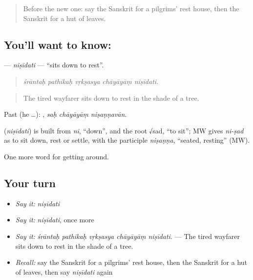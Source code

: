 \label{lesson:SA-C402-nisidati}



\begin{quote}
Before the new one: say the Sanskrit for a pilgrims' rest house, then the Sanskrit for a hut of leaves.
\end{quote}

\subsection*{You'll want to know: }
\textbf{} — \emph{niṣīdati} — \textquotedblleft{}sits down to rest\textquotedblright{}.

\begin{quote}
    
\end{quote}

\begin{quote}
\emph{śrāntaḥ pathikaḥ vṛkṣasya chāyāyāṃ niṣīdati.}
\end{quote}

\begin{quote}
The tired wayfarer sits down to rest in the shade of a tree.
\end{quote}

Past (he …):   , \emph{saḥ chāyāyāṃ niṣaṇṇavān}.

\begin{cousinweb}
\textbf{} (\emph{niṣīdati}) is built from \emph{ni}, \textquotedblleft{}down\textquotedblright{}, and the root √sad, \textquotedblleft{}to sit\textquotedblright{}; MW gives \emph{ni-ṣad} as to sit down, rest or settle, with the participle \emph{niṣaṇṇa}, \textquotedblleft{}seated, resting\textquotedblright{} (MW).
\end{cousinweb}

\begin{grammarlens}[title={What you've built}]
One more word for getting around.
\end{grammarlens}

\subsection*{Your turn}
\begin{itemize}
\raggedright
  \item \emph{Say it:} \emph{niṣīdati}
  \item \emph{Say it:} \emph{niṣīdati}, once more
  \item \emph{Say it:} \emph{śrāntaḥ pathikaḥ vṛkṣasya chāyāyāṃ niṣīdati.} — The tired wayfarer sits down to rest in the shade of a tree.
  \item \emph{Recall:} say the Sanskrit for a pilgrims' rest house, then the Sanskrit for a hut of leaves, then say \emph{niṣīdati} again
\end{itemize}

